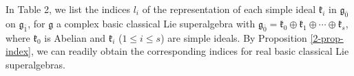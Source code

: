 \documentclass[reqno]{amsart}
\theoremstyle{definition}
\begin{document}
In Table 2,  we list  the indices $l_{i}$ of the representation of each simple ideal $\mathfrak{k}_{i}$ in $\mathfrak{g}_{\bar{0}}$ on $\mathfrak{g}_{\bar{1}}$, for $\mathfrak{g}$  a complex basic classical Lie superalgebra with  $\mathfrak{g}_{\bar{0}}=\mathfrak{k}_{0}\oplus\mathfrak{k}_{1}\oplus\cdots\oplus\mathfrak{k}_{s}$,
where  $\mathfrak{k}_{0}$ is Abelian and $\mathfrak{k}_{i}$ ($1\leq i\leq s$) are simple ideals.
 By Proposition \ref{2-prop-index}, we can readily obtain the corresponding indices for real basic classical Lie superalgebras.
\begin{table}[htbp]
\caption{Indices of basic classical Lie superalgebras }
\centering
\label{T2}
\small{
}
\end{table}
\end{document}
